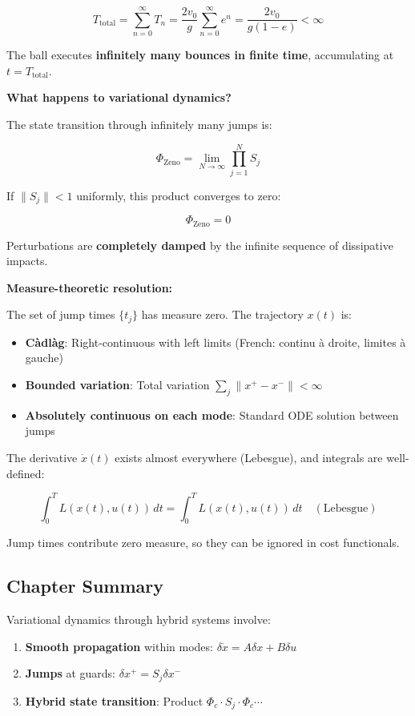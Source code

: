 \documentclass[
  letterpaper,
  DIV=11,
  numbers=noendperiod]{scrartcl}
\providecommand{\tightlist}{%
  \setlength{\itemsep}{0pt}\setlength{\parskip}{0pt}}\usepackage{longtable,booktabs,array}
\begin{document}
\[
T_{\text{total}} = \sum_{n=0}^\infty T_n = \frac{2v_0}{g} \sum_{n=0}^\infty e^n = \frac{2v_0}{g(1 - e)} < \infty
\]

The ball executes \textbf{infinitely many bounces in finite time},
accumulating at \(t = T_{\text{total}}\).

\textbf{What happens to variational dynamics?}

The state transition through infinitely many jumps is:

\[
\Phi_{\text{Zeno}} = \lim_{N \to \infty} \prod_{j=1}^N S_j
\]

If \(\|S_j\| < 1\) uniformly, this product converges to zero:

\[
\Phi_{\text{Zeno}} = 0
\]

Perturbations are \textbf{completely damped} by the infinite sequence of
dissipative impacts.

\textbf{Measure-theoretic resolution:}

The set of jump times \(\{t_j\}\) has measure zero. The trajectory
\(x(t)\) is:

\begin{itemize}
\tightlist
\item
  \textbf{Càdlàg}: Right-continuous with left limits (French: continu à
  droite, limites à gauche)
\item
  \textbf{Bounded variation}: Total variation
  \(\sum_j \|x^+ - x^-\| < \infty\)
\item
  \textbf{Absolutely continuous on each mode}: Standard ODE solution
  between jumps
\end{itemize}

The derivative \(\dot{x}(t)\) exists almost everywhere (Lebesgue), and
integrals are well-defined:

\[
\int_0^T L(x(t), u(t)) \, dt = \int_0^T L(x(t), u(t)) \, dt \quad (\text{Lebesgue})
\]

Jump times contribute zero measure, so they can be ignored in cost
functionals.

\subsection{Chapter Summary}\label{chapter-summary-5}

Variational dynamics through hybrid systems involve:

\begin{enumerate}
\def\labelenumi{\arabic{enumi}.}
\tightlist
\item
  \textbf{Smooth propagation} within modes:
  \(\delta\dot{x} = A\delta x + B\delta u\)
\item
  \textbf{Jumps} at guards: \(\delta x^+ = S_j \delta x^-\)
\item
  \textbf{Hybrid state transition}: Product
  \(\Phi_c \cdot S_j \cdot \Phi_c \cdots\)
\end{enumerate}
\end{document}
